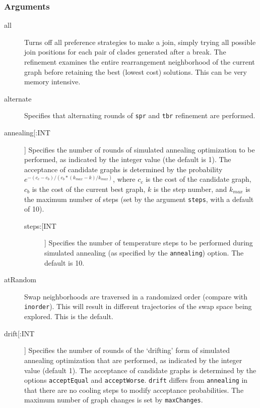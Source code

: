 	\subsubsection{Arguments}
	\begin{description}
		\item[all] Turns off all preference strategies to make a join, simply trying all possible 
		join positions for each pair of clades generated after a break. 
		The refinement examines the entire rearrangement neighborhood of the current graph 
		before retaining the best (lowest cost) solutions. This can be very memory intensive.

		\item[alternate] Specifies that alternating rounds of \texttt{spr} \citep{Dayhoff1969} 
		and \texttt{tbr} \citep{Farris1988, swofford1990a} refinement are performed.
		
		\item[annealing[:INT]] Specifies the number of rounds of simulated annealing 
		\citep{Metropolisetal1953,Kirkpatricketal1983,Cerny1985} optimization to be performed, 
		as indicated by the integer value (the default is 1). The acceptance of candidate graphs 
		is determined by the probability $e ^ {- (c_c - c_b)/ (c_b * (k_{max} -k)/ k_{max})}$, 
		where $c_c$ is the cost of the candidate graph, $c_b$ is the cost of the current best 
		graph, $k$ is the step number, and $k_{max}$ is the maximum number of steps (set 
		by the argument \texttt{steps}, with a default of 10).
		
			\begin{description}
			\item[steps:[INT]] Specifies the number of temperature steps to be performed during 
			simulated annealing (as specified by the \texttt{annealing}) option. The default is 10.
			\end{description}
		
		\item[atRandom] Swap neighborhoods are traversed in a randomized order (compare 
		with \texttt{inorder}). 	This will result in different trajectories of the swap space being 
		explored. This is the default.
		
		\item[drift[:INT]] Specifies the number of rounds of the `drifting' form of simulated 
		annealing \citep{goloboff1999} optimization that are performed, as indicated by the integer 
		value (default 1). The acceptance of candidate graphs is determined by the options 
		\texttt{acceptEqual} and \texttt{acceptWorse}. \texttt{drift} differs from \texttt{annealing} 
		in that there are no cooling steps to modify acceptance probabilities. The maximum 
		number of graph changes is set by \texttt{maxChanges}.
			

\end{description}
